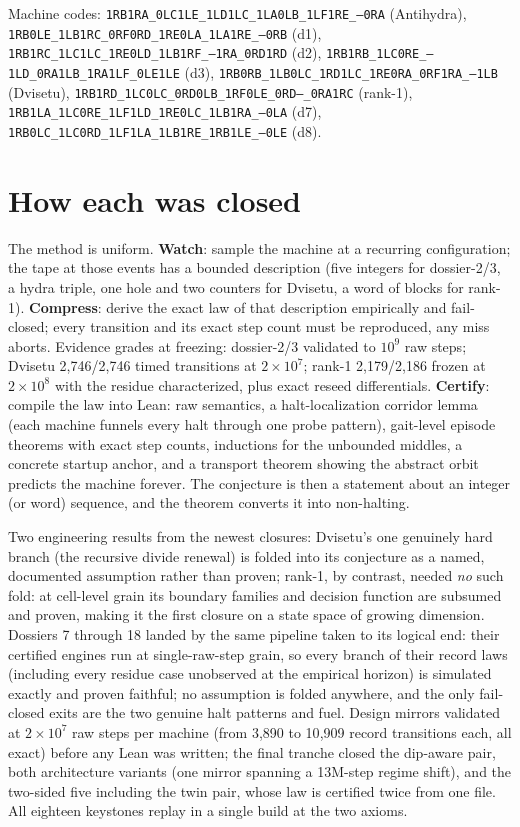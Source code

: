 \documentclass[11pt]{article}
\begin{document}
\noindent Machine codes:
\texttt{\footnotesize 1RB1RA\_0LC1LE\_1LD1LC\_1LA0LB\_1LF1RE\_---0RA} (Antihydra),
\texttt{\footnotesize 1RB0LE\_1LB1RC\_0RF0RD\_1RE0LA\_1LA1RE\_---0RB} (d1),
\texttt{\footnotesize 1RB1RC\_1LC1LC\_1RE0LD\_1LB1RF\_---1RA\_0RD1RD} (d2),
\texttt{\footnotesize 1RB1RB\_1LC0RE\_---1LD\_0RA1LB\_1RA1LF\_0LE1LE} (d3),
\texttt{\footnotesize 1RB0RB\_1LB0LC\_1RD1LC\_1RE0RA\_0RF1RA\_---1LB} (Dvisetu),
\texttt{\footnotesize 1RB1RD\_1LC0LC\_0RD0LB\_1RF0LE\_0RD---\_0RA1RC} (rank-1),
\texttt{\footnotesize 1RB1LA\_1LC0RE\_1LF1LD\_1RE0LC\_1LB1RA\_---0LA} (d7),
\texttt{\footnotesize 1RB0LC\_1LC0RD\_1LF1LA\_1LB1RE\_1RB1LE\_---0LE} (d8).

\section*{How each was closed}

The method is uniform. \textbf{Watch}: sample the machine at a
recurring configuration; the tape at those events has a bounded
description (five integers for dossier-2/3, a hydra triple, one hole
and two counters for Dvisetu, a word of blocks for rank-1).
\textbf{Compress}: derive the exact law of that description
empirically and fail-closed; every transition and its exact step
count must be reproduced, any miss aborts. Evidence grades at
freezing: dossier-2/3 validated to $10^{9}$ raw steps; Dvisetu
2{,}746/2{,}746 timed transitions at $2\times10^{7}$; rank-1
2{,}179/2{,}186 frozen at $2\times10^{8}$ with the residue
characterized, plus exact reseed differentials. \textbf{Certify}:
compile the law into Lean: raw semantics, a halt-localization
corridor lemma (each machine funnels every halt through one probe
pattern), gait-level episode theorems with exact step counts,
inductions for the unbounded middles, a concrete startup anchor, and
a transport theorem showing the abstract orbit predicts the machine
forever. The conjecture is then a statement about an integer (or
word) sequence, and the theorem converts it into non-halting.

Two engineering results from the newest closures: Dvisetu's one
genuinely hard branch (the recursive divide renewal) is folded into
its conjecture as a named, documented assumption rather than proven;
rank-1, by contrast, needed \emph{no} such fold: at cell-level grain
its boundary families and decision function are subsumed and proven,
making it the first closure on a state space of growing dimension.
Dossiers 7 through 18 landed by the same pipeline taken to its
logical end: their certified engines run at single-raw-step grain, so every
branch of their record laws (including every residue case unobserved
at the empirical horizon) is simulated exactly and proven faithful;
no assumption is folded anywhere, and the only fail-closed exits are
the two genuine halt patterns and fuel. Design mirrors validated at $2\times10^{7}$ raw steps per machine
(from 3{,}890 to 10{,}909 record transitions each, all exact) before
any Lean was written; the final tranche closed the dip-aware pair,
both architecture variants (one mirror spanning a 13M-step regime
shift), and the two-sided five including the twin pair, whose law is
certified twice from one file. All eighteen keystones replay in a
single build at the two axioms.
\end{document}
